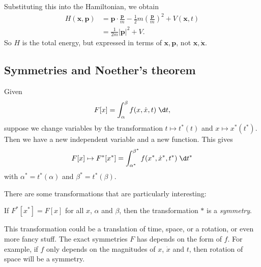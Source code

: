 \documentclass[a4paper]{article}
\begin{document}
Substituting this into the Hamiltonian, we obtain
\begin{align*}
  H(\mathbf{x}, \mathbf{p}) &= \mathbf{p}\cdot \frac{\mathbf{p}}{m} - \frac{1}{2}m\left(\frac{\mathbf{p}}{m}\right)^2 + V(\mathbf{x}, t)\\
  &= \frac{1}{2m}|\mathbf{p}|^2 + V.
\end{align*}
So $H$ is the total energy, but expressed in terms of $\mathbf{x}, \mathbf{p}$, not $\mathbf{x}, \dot{\mathbf{x}}$.
\subsection{Symmetries and Noether's theorem}
Given
\[
  F[x]= \int_\alpha^\beta f(x, \dot{x}, t)\;\d t,
\]
suppose we change variables by the transformation $t \mapsto t^*(t)$ and $x\mapsto x^*(t^*)$. Then we have a new independent variable and a new function. This gives
\[
  F[x] \mapsto F^* [x^*] = \int_{\alpha^*}^{\beta^*} f(x^*, \dot{x}^*, t^*)\;\d t^*
\]
with $\alpha^* = t^*(\alpha)$ and $\beta^* = t^*(\beta)$.

There are some transformations that are particularly interesting:
\begin{defi}[Symmetry]
  If $F^*[x^*] = F[x]$ for all $x$, $\alpha$ and $\beta$, then the transformation $*$ is a \emph{symmetry}.
\end{defi}

This transformation could be a translation of time, space, or a rotation, or even more fancy stuff. The exact symmetries $F$ has depends on the form of $f$. For example, if $f$ only depends on the magnitudes of $x$, $\dot{x}$ and $t$, then rotation of space will be a symmetry.
\end{document}
